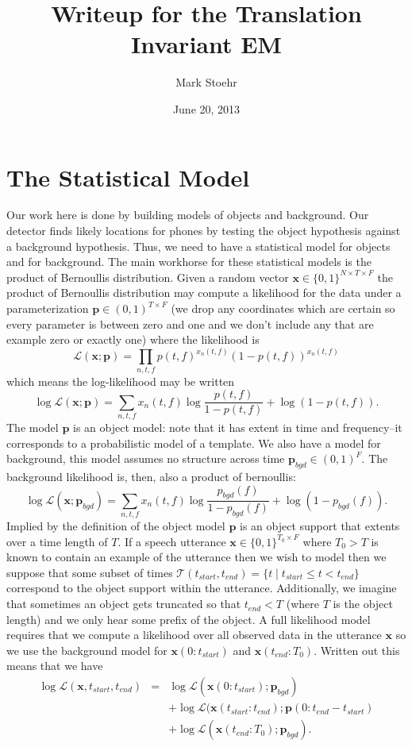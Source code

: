 \documentclass{article}
\title{Writeup for the Translation Invariant EM}
\author{Mark Stoehr}
\date{June 20, 2013}
\begin{document}
\section{The Statistical Model}

Our work here is done by building models of objects and background.  Our detector finds likely locations for phones by testing the object hypothesis
against a background hypothesis.  Thus, we need to have a statistical model for objects and for background.  The main workhorse for these statistical
models is the product of Bernoullis distribution.  Given a random vector $\mathbf{x}\in \{0,1\}^{N\times T\times F}$ the product of Bernoullis distribution
may compute a likelihood for the data under a parameterization $\mathbf{p}\in (0,1)^{T\times F}$ (we drop any coordinates which are certain so every
parameter is between zero and one and we don't include any that are example zero or exactly one)
 where the likelihood is
$$ \mathcal{L}(\mathbf{x}; \mathbf{p}) = \prod_{n,t,f} p(t,f)^{x_n(t,f)}(1-p(t,f))^{x_n(t,f)}  $$
which means the log-likelihood may be written
$$ \log\mathcal{L}(\mathbf{x}; \mathbf{p}) = \sum_{n,t,f} x_n(t,f)\log\frac{p(t,f)}{1-p(t,f)}+\log (1-p(t,f)).  $$
The model $\mathbf{p}$ is an object model: note that it has extent in time and frequency--it corresponds to a probabilistic model of a template.  We also
have a model for background, this model assumes no structure across time $\mathbf{p}_{bgd}\in (0,1)^{F}$.  The background likelihood is, then, also a product
of bernoullis:
\begin{equation}\label{eq-object_likelihood} \log\mathcal{L}(\mathbf{x}; \mathbf{p}_{bgd}) = \sum_{n,t,f} x_n(t,f)\log \frac{p_{bgd}(f)}{1-p_{bgd}(f)}+\log (1-p_{bgd}(f)).\end{equation}
Implied by the definition of the object model $\mathbf{p}$ is an object support that extents over a time length of $T$.  If a speech utterance $\mathbf{x}\in \{0,1\}^{T_0\times F}$ where $T_0 > T$ is known to contain an example of the utterance then we wish to model then we suppose that some subset of times 
$\mathcal{T}(t_{start},t_{end}) = \{ t\mid t_{start}\leq t< t_{end}\}$ correspond to the object support within the utterance.  Additionally, we imagine that sometimes
an object gets truncated so that $t_{end} < T$ (where $T$ is the object length) and we only hear some prefix of the object.  A full likelihood model
requires that we compute a likelihood over all observed data in the utterance $\mathbf{x}$ so we use the background model for $\mathbf{x}(0:t_{start})$
and $\mathbf{x}(t_{end}:T_0)$.  Written out this means that we have
\begin{equation}\label{eq-object_bgd_background}\begin{array}{rcl}
\log\mathcal{L}(\mathbf{x},t_{start},t_{end}) &=& \log\mathcal{L}(\mathbf{x}(0:t_{start}); \mathbf{p}_{bgd})\\
     &&+\log\mathcal{L}(\mathbf{x}(t_{start}:t_{end}); \mathbf{p}(0:t_{end}-t_{start})\\
     &&+\log\mathcal{L}(\mathbf{x}(t_{end}:T_0); \mathbf{p}_{bgd}).
\end{array}\end{equation}
\end{document}
